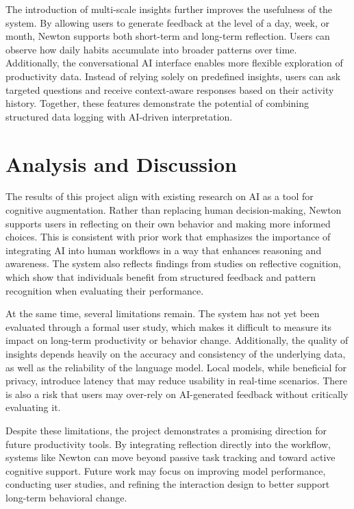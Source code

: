 \documentclass[12pt]{article}
\begin{document}
The introduction of multi-scale insights further improves the usefulness of the system. By allowing users to generate feedback at 
the level of a day, week, or month, Newton supports both short-term and long-term reflection. Users can observe how daily habits 
accumulate into broader patterns over time. Additionally, the conversational AI interface enables more flexible exploration of
 productivity data. Instead of relying solely on predefined insights, users can ask targeted questions and receive context-aware 
 responses based on their activity history. Together, these features demonstrate the potential of combining structured data logging
  with AI-driven interpretation.


\section{Analysis and Discussion}
The results of this project align with existing research on AI as a tool for cognitive augmentation. Rather than replacing human 
decision-making, Newton supports users in reflecting on their own behavior and making more informed choices. This is consistent with
 prior work that emphasizes the importance of integrating AI into human workflows in a way that enhances reasoning and awareness. 
 The system also reflects findings from studies on reflective cognition, which show that individuals benefit from structured feedback
  and pattern recognition when evaluating their performance.

At the same time, several limitations remain. The system has not yet been evaluated through a formal user study, which makes it 
difficult to measure its impact on long-term productivity or behavior change. Additionally, the quality of insights depends heavily
on the accuracy and consistency of the underlying data, as well as the reliability of the language model. Local models, while 
beneficial for privacy, introduce latency that may reduce usability in real-time scenarios. There is also a risk that users may 
over-rely on AI-generated feedback without critically evaluating it.

Despite these limitations, the project demonstrates a promising direction for future productivity tools. By integrating reflection
 directly into the workflow, systems like Newton can move beyond passive task tracking and toward active cognitive support. Future 
 work may focus on improving model performance, conducting user studies, and refining the interaction design to better support 
 long-term behavioral change.
\end{document}
